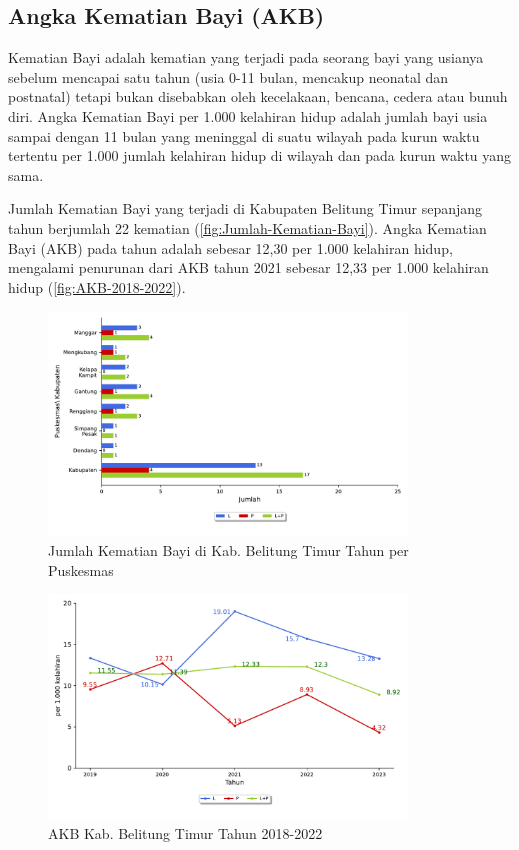 \subsection{Angka Kematian Bayi (AKB)}
Kematian Bayi adalah kematian yang terjadi pada seorang bayi yang usianya sebelum mencapai satu tahun (usia 0-11 bulan, mencakup neonatal dan postnatal) tetapi bukan disebabkan oleh kecelakaan, bencana, cedera atau bunuh diri. Angka Kematian Bayi per 1.000 kelahiran hidup adalah jumlah bayi usia sampai dengan 11 bulan yang meninggal di suatu wilayah pada kurun waktu tertentu per 1.000 jumlah kelahiran hidup di wilayah dan pada kurun waktu yang sama.

Jumlah Kematian Bayi yang terjadi di Kabupaten Belitung Timur sepanjang tahun \tP berjumlah 22 kematian (\autoref{fig:Jumlah-Kematian-Bayi}). Angka Kematian Bayi (AKB) pada tahun \tP adalah sebesar 12,30 per 1.000 kelahiran hidup, mengalami penurunan dari AKB tahun 2021 sebesar 12,33 per 1.000 kelahiran hidup (\autoref{fig:AKB-2018-2022}).

\begin{figure}[H]
    \centering{}
    \includegraphics[width=0.85\textwidth]{bab_05/bab_05_10_kematianBayi}
    \caption{Jumlah Kematian Bayi di Kab. Belitung Timur Tahun \tP per Puskesmas}
    \label{fig:Jumlah-Kematian-Bayi}
\end{figure}

\begin{figure}[H]
    \centering{}
    \includegraphics[width=0.85\textwidth]{bab_05/bab_05_10_plotBayi}
    \caption{AKB Kab. Belitung Timur Tahun 2018-2022}
    \label{fig:AKB-2018-2022}
\end{figure}


